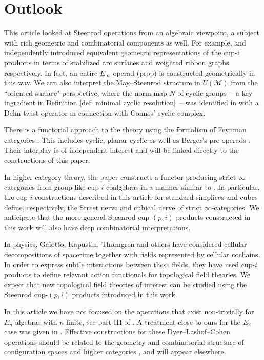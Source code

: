 
\section{Outlook} \label{s:outlook}

This article looked at Steenrod operations from an algebraic viewpoint, a subject with rich geometric and combinatorial components as well.
For example, \cite{Postnikov} and \cite{medina2018prop2} independently introduced equivalent geometric representations of the cup-$i$ products in terms of stabilized arc surfaces \cite{KLP} and weighted ribbon graphs respectively.
In fact, an entire $E_\infty$-operad (prop) is constructed geometrically in this way.
We can also interpret the May--Steenrod structure in $U(\mathcal M)$ from the ``oriented surface" perspective, where the norm map $N$ of cyclic groups --~a key ingredient in Definition \ref{def: minimal cyclic resolution}~-- was identified in \cite{KLP} with a Dehn twist operator in connection with Connes' cyclic complex.

There is a functorial approach to the theory using the formalism of Feynman categories \cite{feynman}.
This includes cyclic, planar cyclic as well as Berger's pre-operads \cite{BergerRecog}.
Their interplay is of independent interest \cite{BergerKaufmann, feyrep} and will be linked directly to the constructions of this paper.

In higher category theory, the paper \cite{medina2020globular} constructs a functor producing strict $\infty$-categories from group-like cup-$i$ coalgebras in a manner similar to \cite{steiner2004omega}.
In particular, the cup-$i$ constructions described in this article for standard simplices and cubes define, respectively, the Street nerve and cubical nerve of strict $\infty$-categories.
We anticipate that the more general Steenrod cup-$(p,i)$ products constructed in this work will also have deep combinatorial interpretations.

In physics, Gaiotto, Kapustin, Thorngren \cite{gaiotto2016spin,bhardwaj2017fermionic,kapustin2017fermionic} and others have considered cellular decompositions of spacetime together with fields represented by cellular cochains.
In order to express subtle interactions between these fields, they have used cup-$i$ products to define relevant action functionals for topological field theories.
We expect that new topological field theories of interest can be studied using the Steenrod cup-$(p,i)$ products introduced in this work.

In this article we have not focused on the operations that exist non-trivially for $E_n$-algebras with $n$ finite, see part III of \cite{may76homology}.
A treatment close to ours for the $E_2$ case was given in \cite{tourtchine2006cohen}.
Effective constructions for these Dyer--Lashof--Cohen operations should be related to the geometry and combinatorial structure of configuration spaces \cite{KZhang, sinha2013littledisks, berger2004combinatorial, ayala2014configuration} and higher categories \cite{Bathigher, BalFiedSchwVogt, Rezkhigher}, and will appear elsewhere.

